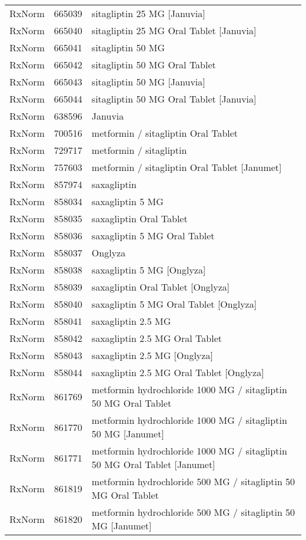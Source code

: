 \begin{longtable}{p{}p{}p{}}
  RxNorm & 665039 & sitagliptin 25 MG [Januvia] \\ 
  RxNorm & 665040 & sitagliptin 25 MG Oral Tablet [Januvia] \\ 
  RxNorm & 665041 & sitagliptin 50 MG \\ 
  RxNorm & 665042 & sitagliptin 50 MG Oral Tablet \\ 
  RxNorm & 665043 & sitagliptin 50 MG [Januvia] \\ 
  RxNorm & 665044 & sitagliptin 50 MG Oral Tablet [Januvia] \\ 
  RxNorm & 638596 & Januvia \\ 
  RxNorm & 700516 & metformin / sitagliptin Oral Tablet \\ 
  RxNorm & 729717 & metformin / sitagliptin \\ 
  RxNorm & 757603 & metformin / sitagliptin Oral Tablet [Janumet] \\ 
  RxNorm & 857974 & saxagliptin \\ 
  RxNorm & 858034 & saxagliptin 5 MG \\ 
  RxNorm & 858035 & saxagliptin Oral Tablet \\ 
  RxNorm & 858036 & saxagliptin 5 MG Oral Tablet \\ 
  RxNorm & 858037 & Onglyza \\ 
  RxNorm & 858038 & saxagliptin 5 MG [Onglyza] \\ 
  RxNorm & 858039 & saxagliptin Oral Tablet [Onglyza] \\ 
  RxNorm & 858040 & saxagliptin 5 MG Oral Tablet [Onglyza] \\ 
  RxNorm & 858041 & saxagliptin 2.5 MG \\ 
  RxNorm & 858042 & saxagliptin 2.5 MG Oral Tablet \\ 
  RxNorm & 858043 & saxagliptin 2.5 MG [Onglyza] \\ 
  RxNorm & 858044 & saxagliptin 2.5 MG Oral Tablet [Onglyza] \\ 
  RxNorm & 861769 & metformin hydrochloride 1000 MG / sitagliptin 50 MG Oral Tablet \\ 
  RxNorm & 861770 & metformin hydrochloride 1000 MG / sitagliptin 50 MG [Janumet] \\ 
  RxNorm & 861771 & metformin hydrochloride 1000 MG / sitagliptin 50 MG Oral Tablet [Janumet] \\ 
  RxNorm & 861819 & metformin hydrochloride 500 MG / sitagliptin 50 MG Oral Tablet \\ 
  RxNorm & 861820 & metformin hydrochloride 500 MG / sitagliptin 50 MG [Janumet] \\ 

\end{longtable}
